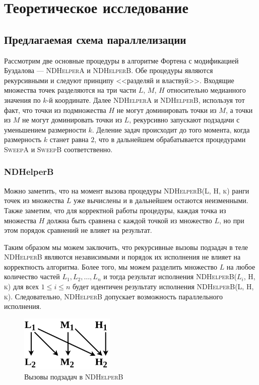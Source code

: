 \chapter{Теоретическое исследование}
\section{Предлагаемая схема параллелизации}
Рассмотрим две основные процедуры в алгоритме Фортена с модификацией Буздалова --- \textsc{NDHelperA} и \textsc{NDHelperB}.
Обе процедуры являются рекурсивными и следуют принципу <<разделяй и властвуй>>.
Входящие множества точек разделяются на три части $L$, $M$, $H$ относительно медианного значения по $k$-й координате.
Далее \textsc{NDHelperA} и \textsc{NDHelperB}, используя тот факт, что точки из подмножества $H$ не могут доминировать точки из $M$, а точки из $M$ не могут доминировать точки из $L$, рекурсивно запускают подзадачи с уменьшением размерности $k$.
Деление задач происходит до того момента, когда размерность $k$ станет равна $2$, что в дальнейшем обрабатывается процедурами \textsc{SweepA} и \textsc{SweepB} соответственно.

\subsection{NDHelperB}
Можно заметить, что на момент вызова процедуры \textsc{NDHelperB(L, H, k)} ранги точек из множества $L$ уже вычислены и в дальнейшем остаются неизменными.
Также заметим, что для корректной работы процедуры, каждая точка из множества $H$ должна быть сравнена с каждой точкой из множество $L$, но при этом порядок сравнений не влияет на результат.

Таким образом мы можем заключить, что рекурсивные вызовы подзадач в теле \textsc{NDHelperB} являются независимыми и порядок их исполнения не влияет на корректность алгоритма.
Более того, мы можем разделить множество $L$ на любое количество частей ${L_1, L_2,\ldots, L_n}$ и тогда результат исполнения \textsc{NDHelperB($L_i$, H, k)} для всех $1\leq i\leq n$ будет идентичен результату исполнения \textsc{NDHelperB(L, H, k)}.
Следовательно, \textsc{NDHelperB} допускает возможность параллельного исполнения.

\begin{figure}[h]
\centering
\includegraphics[width=0.4\textwidth]{images/ndb.png}
\caption{Вызовы подзадач в \textsc{NDHelperB}}
\end{figure}


